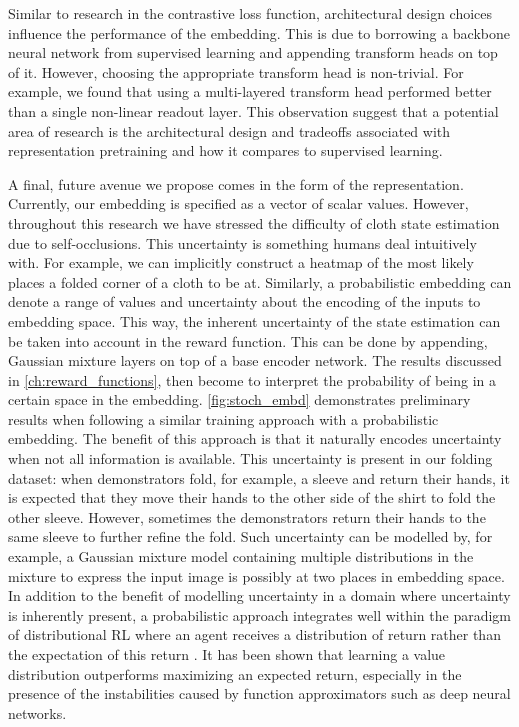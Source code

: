 \documentclass[\home/main.tex]{subfiles}
\begin{document}
Similar to research in the contrastive loss function, architectural design choices influence the performance of the embedding. This is due to borrowing a backbone neural network from supervised learning and appending transform heads on top of it. However, choosing the appropriate transform head is non-trivial. For example, we found that using a multi-layered transform head performed better than a single non-linear readout layer. This observation suggest that a potential area of research is the architectural design and tradeoffs associated with representation pretraining and how it compares to supervised learning.

A final, future avenue we propose comes in the form of the representation. Currently, our embedding is specified as a vector of scalar values. However, throughout this research we have stressed the difficulty of cloth state estimation due to self-occlusions. This uncertainty is something humans deal intuitively with. For example, we can implicitly construct a heatmap of the most likely places a folded corner of a cloth to be at. Similarly, a probabilistic embedding can denote a range of values and uncertainty about the encoding of the inputs to embedding space. This way, the inherent uncertainty of the state estimation can be taken into account in the reward function. This can be done by appending, Gaussian mixture layers on top of a base encoder network. The results discussed in \cref{ch:reward_functions}, then become to interpret the probability of being in a certain space in the embedding. \cref{fig:stoch_embd} demonstrates preliminary results when following a similar training approach with a probabilistic embedding. The benefit of this approach is that it naturally encodes uncertainty when not all information is available. This uncertainty is present in our folding dataset: when demonstrators fold, for example, a sleeve and return their hands, it is expected that they move their hands to the other side of the shirt to fold the other sleeve. However, sometimes the demonstrators return their hands to the same sleeve to further refine the fold. Such uncertainty can be modelled by, for example, a Gaussian mixture model containing multiple distributions in the mixture to express the input image is possibly at two places in embedding space. In addition to the benefit of modelling uncertainty in a domain where uncertainty is inherently present, a probabilistic approach integrates well within the paradigm of distributional RL where an agent receives a distribution of return rather than the expectation of this return \autocite{bellemare2017distributional}. It has been shown that learning a value distribution outperforms maximizing an expected return, especially in the presence of the instabilities caused by function approximators such as deep neural networks.
\end{document}
